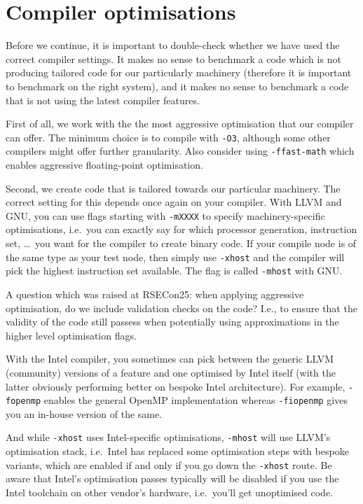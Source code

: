 \section{Compiler optimisations}
\label{section:core:compiler-optimisations}

Before we continue, it is important to double-check whether we have used the correct
compiler settings. It makes no sense to benchmark a code which is not producing
tailored code for our particularly machinery (therefore it is important to
benchmark on the right system), and it makes no sense to benchmark a code that
is not using the latest compiler features.


First of all, we work with the the most aggressive optimisation that our
compiler can offer. The minimum choice is to compile with \texttt{-O3},
although some other compilers might offer further granularity. Also consider
using \texttt{-ffast-math} which enables aggressive floating-point optimisation.


Second, we create code that is tailored towards our particular machinery.
The correct setting for this depends once again on your compiler. 
With LLVM and GNU, you can use flags starting with \texttt{-mXXXX} to specify 
machinery-specific optimisations, i.e.~you can exactly say for which processor
generation, instruction set, \ldots~you want for the compiler to create binary code.
If your compile node is of the same type as your test node, then simply
use \texttt{-xhost} and the compiler will pick the highest instruction set
available.
The flag is called \texttt{-mhost} with GNU.


\begin{wip}
A question which was raised at RSECon25: when applying aggressive optimisation, do we include validation checks on the code? I.e., to ensure that the validity of the code still passess when potentially using approximations in the higher level optimisation flags.
\end{wip}

\begin{instructions}{\intelcompiler}
 With the Intel compiler, you sometimes can pick between the generic
 LLVM (community) versions of a feature and one optimised by Intel itself (with
 the latter obviously performing better on bespoke Intel architecture). For
 example, \texttt{-fopenmp} enables the general OpenMP implementation whereas
 \texttt{-fiopenmp} gives you an in-house version of the same. 
 
 And while \texttt{-xhost} uses Intel-specific optimisations, \texttt{-mhost}
 will use LLVM's optimisation stack, i.e.~Intel has replaced some optimisation
 steps with bespoke variants, which are enabled if and only if you go down the
 \texttt{-xhost} route. Be aware that Intel's optimisation passes typically will
 be disabled if you use the Intel toolchain on other vendor's hardware,
 i.e.~you'll get unoptimised code.
\end{instructions}

